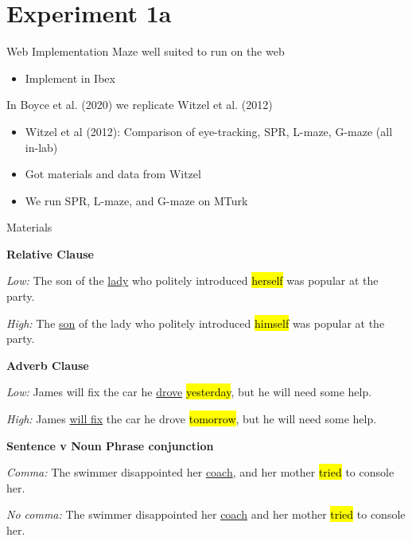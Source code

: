 \documentclass[12pt, xcolor=beamer,table,usenames,dvipsnames, ignorenonframetext, ngerman]{beamer}
\makeatletter
\let\HL\hl
\renewcommand\hl{%
	\let\set@color\beamerorig@set@color
	\let\reset@color\beamerorig@reset@color
	\HL}
\makeatother
\begin{document}
\section{Experiment 1a}
\begin{frame}{Web Implementation}
Maze well suited to run on the web
\begin{itemize}
	\item Implement in Ibex
\end{itemize} 
\pause

In Boyce et al. (2020) we replicate Witzel et al. (2012)
\begin{itemize}
	\item Witzel et al (2012): Comparison of eye-tracking, SPR, L-maze, G-maze (all in-lab)
	\item Got materials and data from Witzel
	\item We run SPR, L-maze, and G-maze on MTurk
\end{itemize}
\end{frame}

\begin{frame}{Materials}

\textbf{Relative Clause}

\textit{Low:} The son of the \uline{lady} who politely introduced \hl{herself} was popular at the party.

 \textit{High:} The \uline{son} of the lady who politely introduced \hl{himself} was popular at the party.
 

\textbf{Adverb Clause}

\textit{Low:} James will fix the car he \uline{drove} \hl{yesterday}, but he will need some help.

 \textit{High:} James \uline{will fix} the car he drove \hl{tomorrow}, but he will need some help.
		
\textbf{Sentence v Noun Phrase conjunction}

 \textit{Comma:} The swimmer disappointed her \uline{coach}, and her mother \hl{tried} to console her.

\textit{No comma:} The swimmer disappointed her \uline{coach} and her mother \hl{tried} to console her.
\end{frame}
\end{document}
